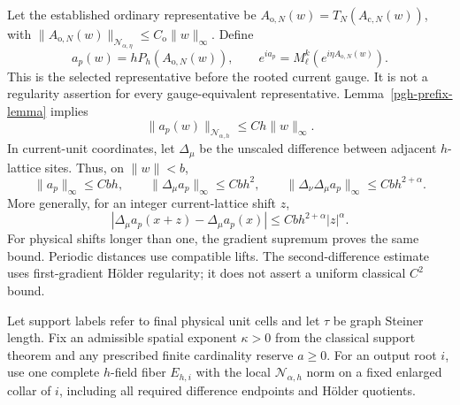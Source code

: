\documentclass[11pt]{article}
\theoremstyle{remark}
\begin{document}
Let the established ordinary representative be
$A_{\mathrm o,N}(w)=T_N(A_{\mathrm c,N}(w))$, with
$\|A_{\mathrm o,N}(w)\|_{\mathcal N_{\alpha,\eta}}
\le C_{\mathrm o}\|w\|_\infty$. Define
\begin{equation}
 a_p(w)=hP_h(A_{\mathrm o,N}(w)),\qquad
 e^{ia_p}=M_\ell^k(e^{i\eta A_{\mathrm o,N}(w)}).
 \label{pgh-pregauge}
\end{equation}
This is the selected representative before the rooted current
gauge. It is not a regularity assertion for every gauge-equivalent
representative. Lemma~\ref{pgh-prefix-lemma} implies
\begin{equation}
 \|a_p(w)\|_{\mathcal N_{\alpha,h}}
                  \le Ch\|w\|_\infty.
 \label{pgh-angle-norm}
\end{equation}
In current-unit coordinates, let $\Delta_\mu$ be the unscaled
difference between adjacent $h$-lattice sites. Thus, on $\|w\|<b$,
\begin{equation}
 \|a_p\|_\infty\le Cbh,\qquad
 \|\Delta_\mu a_p\|_\infty\le Cbh^2,\qquad
 \|\Delta_\nu\Delta_\mu a_p\|_\infty
                         \le Cbh^{2+\alpha}.
 \label{pgh-scale-bounds}
\end{equation}
More generally, for an integer current-lattice shift $z$,
\begin{equation}
 |\Delta_\mu a_p(x+z)-\Delta_\mu a_p(x)|
                  \le Cbh^{2+\alpha}|z|^\alpha.
 \label{pgh-shift-bound}
\end{equation}
For physical shifts longer than one, the gradient supremum
proves the same bound. Periodic distances use compatible lifts.
The second-difference estimate uses first-gradient H\"older
regularity; it does not assert a uniform classical $C^2$ bound.

Let support labels refer to final physical unit cells and let
$\tau$ be graph Steiner length. Fix an admissible spatial exponent
$\kappa>0$ from the classical support theorem and any prescribed
finite cardinality reserve $a\ge0$. For an output root $i$, use
one complete $h$-field fiber $E_{h,i}$ with the local
$\mathcal N_{\alpha,h}$ norm on a fixed enlarged collar of $i$,
including all required difference endpoints and H\"older quotients.
\end{document}
